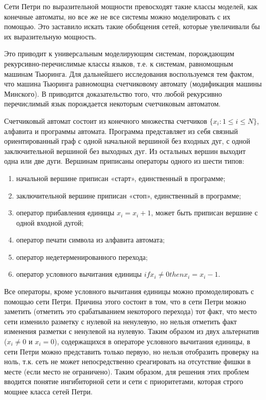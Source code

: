 Сети Петри по выразительной мощности превосходят такие классы моделей, как конечные автоматы, но все же не все системы можно моделировать с их помощью. Это заставило искать такие обобщения сетей, которые увеличивали бы их выразительную мощность.

Это приводит к универсальным моделирующим системам, порождающим рекурсивно-перечислимые классы языков, т.е. к системам, равномощным машинам Тьюринга. Для дальнейшего исследования воспользуемся тем фактом, что машина Тьюринга равномощна счетчиковому автомату (модификация машины Минского). В \cite{Kotov} приводится доказательство того, что любой рекурсивно перечислимый язык порождается некоторым счетчиковым автоматом.

Счетчиковый автомат состоит из конечного множества счетчиков $ \{ x_{i} : 1 \leq i \leq N \} $, алфавита и программы автомата. Программа представляет из себя связный ориентированный граф с одной начальной вершиной без входных дуг, с одной заключительной вершиной без выходных дуг. Из остальных вершин выходит одна или две дуги. Вершинам приписаны операторы одного из шести типов:
\begin{enumerate}
\item начальной вершине приписан «старт», единственный в программе;
\item заключительной вершине приписан «стоп», единственный в программе;
\item оператор прибавления единицы $ x_{i} = x_{i} + 1 $, может быть приписан вершине с одной входной дугой;
\item оператор печати символа из алфавита автомата;
\item оператор недетерменированного перехода;
\item оператор условного вычитания единицы $ if x_{i} \neq 0 then x_{i} = x_{i} - 1 $.
\end{enumerate}

Все операторы, кроме условного вычитания единицы можно промоделировать с помощью сети Петри. Причина этого состоит в том, что в сети Петри можно заметить (отметить это срабатыванием некоторого перехода) тот факт, что место сети изменило разметку с нулевой на ненулевую, но нельзя отметить факт изменения разметки с ненулевой на нулевую. Таким образом из двух альтернатив ($ x_{i} \neq 0 $ и $ x_{i} = 0 $), содержащихся в операторе условного вычитания единицы, в сети Петри можно представить только первую, но нельзя отобразить проверку на ноль, т.к. сеть не может непосредственно среагировать на отсутствие фишки в месте (если место не ограничено).\cite{Piterson} Таким образом, для решения этих проблем вводится понятие ингибиторной сети и сети с приоритетами, которая строго мощнее класса сетей Петри. 

